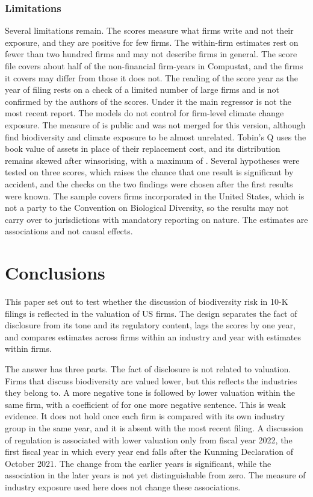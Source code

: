 \documentclass[12pt,a4paper]{article}
\begin{document}
\subsubsection{Limitations}

Several limitations remain. The scores measure what firms write and not their exposure, and they are positive for few firms. The within-firm estimates rest on fewer than two hundred firms and may not describe firms in general. The score file covers about half of the non-financial firm-years in Compustat, and the firms it covers may differ from those it does not. The reading of the score year as the year of filing rests on a check of a limited number of large firms and is not confirmed by the authors of the scores. Under it the main regressor is not the most recent report. The models do not control for firm-level climate change exposure. The measure of \citet{sautner2023} is public and was not merged for this version, although \citet{giglio2026} find biodiversity and climate exposure to be almost unrelated. Tobin's Q uses the book value of assets in place of their replacement cost, and its distribution remains skewed after winsorising, with a maximum of \maxQ{}. Several hypotheses were tested on three scores, which raises the chance that one result is significant by accident, and the checks on the two findings were chosen after the first results were known. The sample covers firms incorporated in the United States, which is not a party to the Convention on Biological Diversity, so the results may not carry over to jurisdictions with mandatory reporting on nature. The estimates are associations and not causal effects.

\section{Conclusions}

This paper set out to test whether the discussion of biodiversity risk in 10-K filings is reflected in the valuation of US firms. The design separates the fact of disclosure from its tone and its regulatory content, lags the scores by one year, and compares estimates across firms within an industry and year with estimates within firms.

The answer has three parts. The fact of disclosure is not related to valuation. Firms that discuss biodiversity are valued lower, but this reflects the industries they belong to. A more negative tone is followed by lower valuation within the same firm, with a coefficient of \coefFAllNeg{} for one more negative sentence. This is weak evidence. It does not hold once each firm is compared with its own industry group in the same year, and it is absent with the most recent filing. A discussion of regulation is associated with lower valuation only from fiscal year 2022, the first fiscal year in which every year end falls after the Kunming Declaration of October 2021. The change from the earlier years is significant, while the association in the later years is not yet distinguishable from zero. The measure of industry exposure used here does not change these associations.
\end{document}
